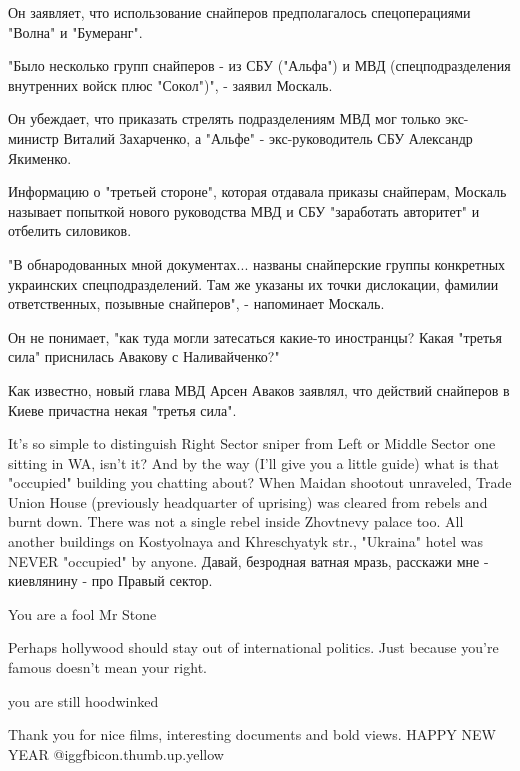 \begin{itemize}
\begin{itemize}
\begin{multicols}{2}
Он заявляет, что использование снайперов предполагалось спецоперациями "Волна"
и "Бумеранг".

"Было несколько групп снайперов - из СБУ ("Альфа") и МВД (спецподразделения
внутренних войск плюс "Сокол")", - заявил Москаль.

Он убеждает, что приказать стрелять подразделениям МВД мог только экс-министр
Виталий Захарченко, а "Альфе" - экс-руководитель СБУ Александр Якименко.

Информацию о "третьей стороне", которая отдавала приказы снайперам, Москаль
называет попыткой нового руководства МВД и СБУ "заработать авторитет" и
отбелить силовиков.

"В обнародованных мной документах... названы снайперские группы конкретных
украинских спецподразделений. Там же указаны их точки дислокации, фамилии
ответственных, позывные снайперов", - напоминает Москаль.

Он не понимает, "как туда могли затесаться какие-то иностранцы? Какая "третья
сила" приснилась Авакову с Наливайченко?"

Как известно, новый глава МВД Арсен Аваков заявлял, что действий снайперов в
Киеве причастна некая "третья сила".
\end{multicols}


It's so simple to distinguish Right Sector sniper from Left or Middle Sector
one sitting in WA, isn't it? And by the way (I'll give you a little guide) what
is that "occupied" building you chatting about? When Maidan shootout unraveled,
Trade Union House (previously headquarter of uprising) was cleared from rebels
and burnt down. There was not a single rebel inside Zhovtnevy palace too. All
another buildings on Kostyolnaya and Khreschyatyk str., "Ukraina" hotel was
NEVER "occupied" by anyone. Давай, безродная ватная мразь, расскажи мне -
киевлянину - про Правый сектор.

\end{itemize} %

You are a fool Mr Stone


Perhaps hollywood should stay out of international politics. Just because
you're famous doesn't mean your right.

you are still hoodwinked

Thank you for nice films, interesting documents and bold views. HAPPY NEW YEAR  @igg{fbicon.thumb.up.yellow} 


\end{itemize}
